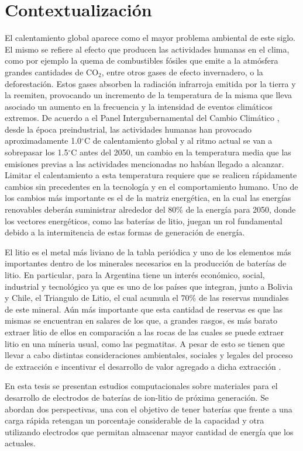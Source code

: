 \section{Contextualización}

El calentamiento global aparece como el mayor problema ambiental de este siglo.
El mismo se refiere al efecto que producen las actividades humanas en el clima, 
como por ejemplo la quema de combustibles fósiles que emite 
a la atmósfera grandes cantidades de CO$_2$, entre otros gases de efecto 
invernadero, o la deforestación. Estos gases absorben la radiación infrarroja emitida por la tierra y la reemiten, 
provocando un incremento de la temperatura de la misma que lleva asociado un 
aumento en la frecuencia y la intensidad de eventos climáticos extremos. %
De acuerdo a el Panel Intergubernamental del Cambio Climático 
\cite{IPCC}, desde la época preindustrial, las actividades humanas han provocado 
aproximadamente 1.0$^{\circ}$C de calentamiento global y al ritmo actual se van 
a sobrepasar los 1.5$^{\circ}$C antes del 2050, un cambio en la temperatura
media que las emisiones previas a las actividades mencionadas no habían llegado a alcanzar. Limitar el 
calentamiento a esta temperatura requiere que se realicen rápidamente cambios 
sin precedentes en la tecnología y en el comportamiento humano. Uno de los 
cambios más importante es el de la matriz energética, en la cual las energías 
renovables deberán suministrar alrededor del 80\% de la energía para 2050, donde 
los vectores energéticos, como las baterías de litio, juegan un rol fundamental 
debido a la intermitencia de estas formas de generación de energía.

El litio es el metal más liviano de la tabla periódica y uno de los elementos más
importantes dentro de los minerales necesarios en la producción de baterías de
litio. En particular, para la Argentina tiene un interés económico, social, 
industrial y tecnológico ya que es uno de los países que integran, junto a 
Bolivia y Chile, el Triangulo de Litio, el cual acumula el 70\% de las reservas 
mundiales de este mineral. Aún más importante que esta cantidad de reservas es 
que las mismas se encuentran en salares de los que, a grandes rasgos, es más barato
extraer litio de ellos en comparación a las rocas de las cuales se puede extraer 
litio en una míneria usual, como las pegmatitas. A pesar de esto se tienen que
llevar a cabo distintas consideraciones ambientales, sociales y legales del 
proceso de extracción e incentivar el desarrollo de valor agregado a dicha 
extracción \cite{gutierrez2022, petavratzi2022, obaya2021, romero2021, 
heredia2020, fornillo2019}.

En esta tesis se presentan estudios computacionales sobre materiales para el 
desarrollo de electrodos de baterías de ion-litio de próxima generación. Se 
abordan dos perspectivas, una con el objetivo de tener baterías que frente a una 
carga rápida retengan un porcentaje considerable de la capacidad y otra 
utilizando electrodos que permitan almacenar mayor cantidad de energía que los 
actuales.
